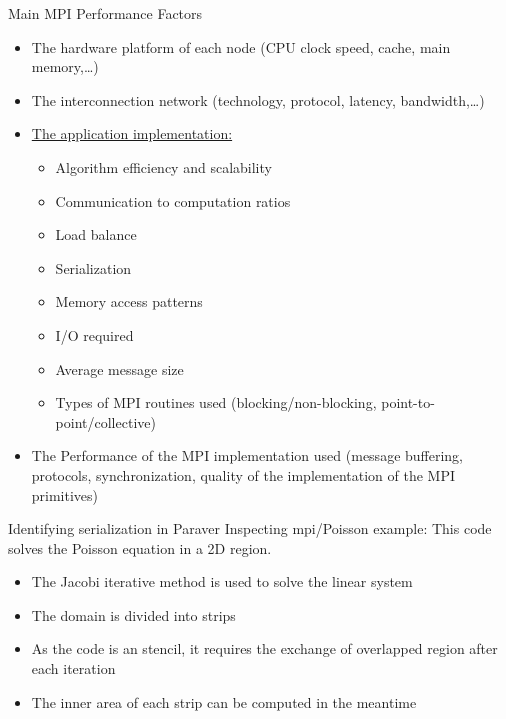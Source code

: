 \documentclass[10pt,xcolor=table]{beamer}
\begin{document}
\begin{frame}{Main MPI Performance Factors}
\begin{itemize}
    \item The hardware platform of each node (CPU clock speed, cache, main memory,\ldots)
    \item The interconnection network (technology, protocol, latency, bandwidth,\ldots)
    \item \underline{The application implementation:}
        \begin{itemize}
            \item Algorithm efficiency and scalability
            \item Communication to computation ratios
            \item Load balance
            \item Serialization
            \item Memory access patterns
            \item I/O required
            \item Average message size
            \item Types of MPI routines used (blocking/non-blocking, point-to-point/collective)            
        \end{itemize}
    \item  The Performance of the MPI implementation used (message buffering, protocols, synchronization, quality of the implementation of the MPI primitives)
\end{itemize}
    
\end{frame}

\begin{frame}{Identifying serialization in Paraver}
Inspecting mpi/Poisson example: This code solves the Poisson equation in a 2D region. 

\begin{itemize}
    \item The Jacobi iterative method is used to solve the linear system
    \item The domain is divided into strips
    \item As the code is an stencil, it requires the exchange of overlapped region after each iteration
    \item The inner area of each strip can be computed in the meantime
\end{itemize}
\end{frame}
\end{document}
